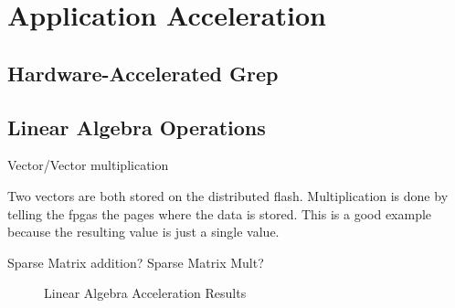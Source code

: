 \section{Application Acceleration}
\subsection{Hardware-Accelerated Grep}

\subsection{Linear Algebra Operations}

Vector/Vector multiplication

Two vectors are both stored on the distributed flash.
Multiplication is done by telling the fpgas the pages where the data is
stored. This is a good example because the resulting value is just a single
value.

Sparse Matrix addition?
Sparse Matrix Mult?

\begin{figure}[h]
	\begin{center}
	\caption{Linear Algebra Acceleration Results}
	\label{fig:result_algebra}
	\end{center}
\end{figure}
